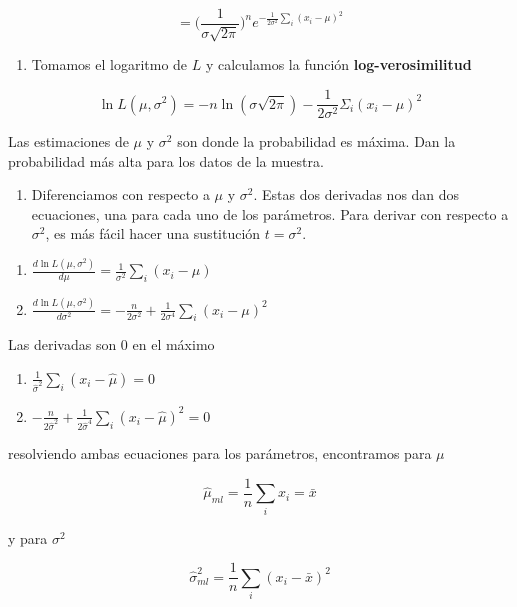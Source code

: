 \documentclass[
]{book}
\providecommand{\tightlist}{%
  \setlength{\itemsep}{0pt}\setlength{\parskip}{0pt}}
\begin{document}
\[=\big( \frac{1}{\sigma \sqrt{2 \pi}}\big)^ne^{-\frac{1}{2\sigma^2} \sum_i(x_i-\mu) ^2}\]

\begin{enumerate}
\def\labelenumi{\arabic{enumi}.}
\setcounter{enumi}{1}
\tightlist
\item
  Tomamos el logaritmo de \(L\) y calculamos la función \textbf{log-verosimilitud}
\end{enumerate}

\[\ln L(\mu, \sigma^2)=-n \ln(\sigma \sqrt{2 \pi})-\frac{1}{2\sigma^2} \Sigma_i(x_i-\mu )^2\]

Las estimaciones de \(\mu\) y \(\sigma^2\) son donde la probabilidad es máxima. Dan la probabilidad más alta para los datos de la muestra.

\begin{enumerate}
\def\labelenumi{\arabic{enumi}.}
\setcounter{enumi}{2}
\tightlist
\item
  Diferenciamos con respecto a \(\mu\) y \(\sigma^2\). Estas dos derivadas nos dan dos ecuaciones, una para cada uno de los parámetros. Para derivar con respecto a \(\sigma^2\), es más fácil hacer una sustitución \(t=\sigma^2\).
\end{enumerate}

\begin{enumerate}
\def\labelenumi{\alph{enumi})}
\item
  \(\frac{d \ln L(\mu, \sigma^2)}{d\mu}=\frac{1}{\sigma^2} \sum_i(x_i-\mu)\)
\item
  \(\frac{d \ln L(\mu, \sigma^2)}{d\sigma^2}=-\frac{n}{2 \sigma^2}+\frac{1}{2\sigma^4} \sum_i(x_i-\mu)^2\)
\end{enumerate}

Las derivadas son \(0\) en el máximo

\begin{enumerate}
\def\labelenumi{\alph{enumi})}
\tightlist
\item
  \(\frac{1}{\hat{\sigma}^2} \sum_i(x_i-\hat{\mu})=0\)
\item
  \(-\frac{n}{2 \hat{\sigma}^2}+\frac{1}{2\hat{\sigma}^4} \sum_i(x_i-\hat{\mu})^ 2=0\)
\end{enumerate}

resolviendo ambas ecuaciones para los parámetros, encontramos para \(\mu\)

\[\hat{\mu}_{ml}=\frac{1}{n}\sum_i x_i=\bar{x}\]

y para \(\sigma^2\)

\[\hat{\sigma}^2_{ml}=\frac{1}{n}\sum_i(x_i-\bar{x})^2\]
\end{document}
